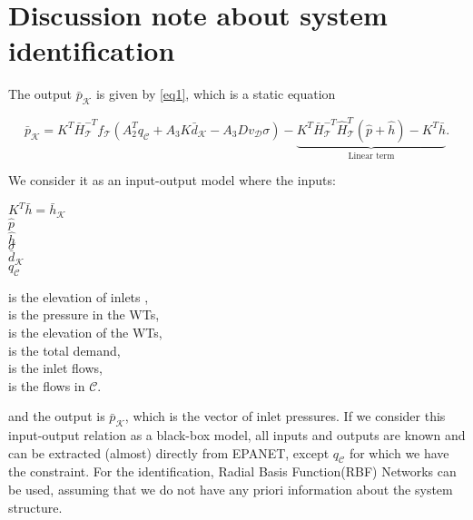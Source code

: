 


\frontmatter
{}

\section{Discussion note about system identification}

The output $\bar{p}_{\mathcal{K}}$ is given by \eqref{eq1}, which is a static equation

\begin{equation}
  \label{eq1}
  \bar{p}_{\mathcal{K}} = K^T \bar{H}^{-T}_{\mathcal{T}}f_{\mathcal{T}}(A_2^T q_\mathcal{C} + A_3 K \bar{d}_{\mathcal{K}} - A_3 D v_{\mathcal{D}} \sigma) - \underbrace{K^T\bar{H}^{-T}_{\mathcal{T}}\hat{H}^{T}_{\mathcal{T}} (\hat{p} + \hat{h}) - K^T\bar{h}}_{\text{Linear term}} .
\end{equation}

We consider it as an input-output model where the inputs:

 \begin{minipage}[t]{0.2\textwidth}
\hspace*{6mm} $K^T\bar{h} = \bar{h}_{\mathcal{K}} $ \\
\hspace*{6mm} $\hat{p}$  \\
\hspace*{6mm} $\hat{h}$ \\
\hspace*{6mm} $\sigma$ \\
\hspace*{6mm} $\bar{d}_{\mathcal{K}}$ \\
\hspace*{6mm} $q_\mathcal{C}$
\end{minipage}
\begin{minipage}[t]{0.58\textwidth}
is the elevation of inlets ,\\
is the pressure in the WTs, \\
is the elevation of the WTs, \\
is the total demand, \\
is the inlet flows, \\
is the flows in $\mathcal{C}$.
\end{minipage}

and the output is $\bar{p}_{\mathcal{K}}$, which is the vector of inlet pressures. If we consider this input-output relation as a black-box model, all inputs and outputs are known and can be extracted (almost) directly from EPANET, except $q_\mathcal{C}$ for which we have the constraint. For the identification, Radial Basis Function(RBF) Networks can be used, assuming that we do not have any priori information about the system structure. 

